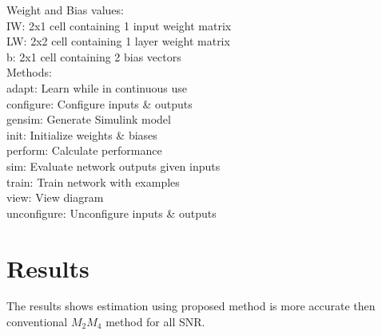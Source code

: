 \documentclass[12pt]{report}
\begin{document}
Weight and Bias values:\\
IW: {2x1 cell} containing 1 input weight matrix\\
LW: {2x2 cell} containing 1 layer weight matrix\\
b: {2x1 cell} containing 2 bias vectors\\

Methods:\\
adapt: Learn while in continuous use\\
configure: Configure inputs \& outputs\\
gensim: Generate Simulink model\\
init: Initialize weights \& biases\\
perform: Calculate performance\\
sim: Evaluate network outputs given inputs\\
train: Train network with examples\\
view: View diagram\\
unconfigure: Unconfigure inputs \& outputs\\



\section{Results}
The results shows estimation using proposed method is more accurate then conventional $M_2M_4$ method for all SNR. 
\end{document}
